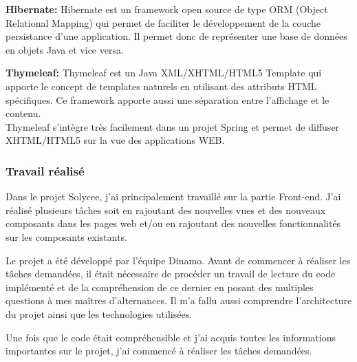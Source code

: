 \documentclass[12pt]{article}
\begin{document}
\textbf{Hibernate: } Hibernate est un framework open source de type ORM (Object Relational Mapping) qui permet de faciliter le développement de la couche persistance d'une application. Il permet donc de représenter une base de données en objets Java et vice versa.

\textbf{Thymeleaf:} Thymeleaf est un Java XML/XHTML/HTML5 Template qui apporte le concept de templates naturels en utilisant des attributs HTML spécifiques. Ce framework apporte aussi une séparation entre l'affichage et le contenu.\\

Thymeleaf s’intègre très facilement dans un projet Spring et permet de diffuser XHTML/HTML5 sur la vue des applications WEB.


\subsubsection{Travail réalisé}


Dans le projet Solycee, j'ai principalement travaillé sur la partie Front-end. J'ai réalisé plusieurs tâches soit en rajoutant des nouvelles vues et des nouveaux composants dans les pages web et/ou en rajoutant des nouvelles fonctionnalités sur les composants existants.

Le projet a été développé par l'équipe Dinamo. Avant de commencer à réaliser les tâches demandées, il était nécessaire de procéder un travail  de lecture du code implémenté et de la compréhension de ce dernier en posant des multiples questions à mes maîtres d'alternances. Il m'a fallu aussi comprendre l'architecture du projet ainsi que les technologies utilisées. 

Une fois que le code était compréhensible et j'ai acquis toutes les informations importantes sur le projet, j'ai commencé à réaliser les tâches demandées.
\end{document}
